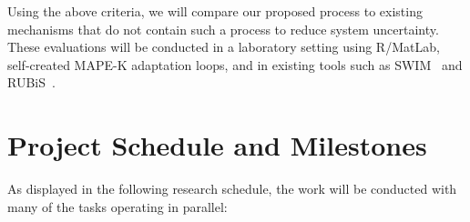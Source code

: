 \documentclass[12pt]{article}
\begin{document}
Using the above criteria, we will compare our proposed process to existing mechanisms that do not contain such a process to reduce system uncertainty. These evaluations will be conducted in a laboratory setting using R/MatLab, self-created MAPE-K adaptation loops, and in existing tools such as SWIM~\cite{moreno2018swim} and RUBiS~\cite{Rubis_URL}.








\vspace{-5mm}
\section{Project Schedule and Milestones}
As displayed in the following research schedule, the work will be conducted with many of the tasks operating in parallel:

 \setcounter{milestoneCounter}{1}

\newcommand{\bLozenge}{\mathbin{\blacklozenge}}
\end{document}
